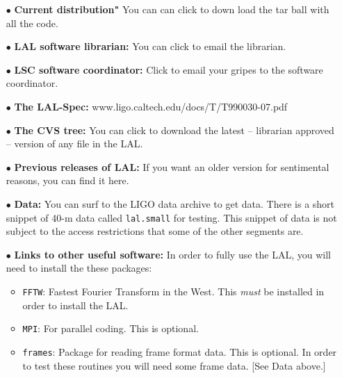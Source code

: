 \documentclass[oneside]{book}
\begin{document}
\begin{itemize}
   \vspace*{-0.1in}
    \item[$\bullet$ ]  {\bf Current distribution"} You can can click
                       to down load the tar ball with all the code.
    \vspace*{-0.051in}
    \item[$\bullet$ ] {\bf LAL software librarian:}  You can click to
                      email the librarian.
    \vspace*{-0.051in}
    \item[$\bullet$ ] {\bf LSC software coordinator:} Click
                      to email your gripes to the software coordinator.
    \vspace*{-0.051in}
    \item[$\bullet$ ] {\bf The LAL-Spec:} 
                      www.ligo.caltech.edu/docs/T/T990030-07.pdf
    \vspace*{-0.051in}
    \item[$\bullet$ ] {\bf The CVS tree:}  You can click to download
                      the latest -- librarian approved -- version of 
                      any file in the LAL.
    \vspace*{-0.051in}
    \item[$\bullet$]  {\bf Previous releases of LAL:} If you want an older 
                      version for sentimental reasons, you can find it here.
    \vspace*{-0.051in}
    \item[$\bullet$ ] {\bf Data:}  You can surf to the LIGO data archive to get
                      data.  There is a short snippet of 40-m data called 
                      {\tt lal.small} for testing.  This snippet of data 
                      is not subject to the access restrictions that some 
                      of the other segments are.
    \vspace*{-0.051in}
    \item[$\bullet$ ] {\bf Links to other useful software:} In order to
                      fully use the LAL, you will need to install the
                      these packages:
    \begin{itemize} 
          \vspace*{-0.051in}
          \item {\texttt {FFTW}}:  Fastest Fourier Transform in the West.
          This {\it must} be installed in order to install the LAL.
          \vspace*{-0.051in}
          \item {\texttt {MPI}}:  For parallel coding. This is
          optional.
          \vspace*{-0.051in}
          \item {\texttt {frames}}: Package for reading frame format data.
          This is optional.
          In order to test these routines you will need some frame
          data. [See Data above.]
    \end{itemize} 
\end{itemize}
\end{document}
